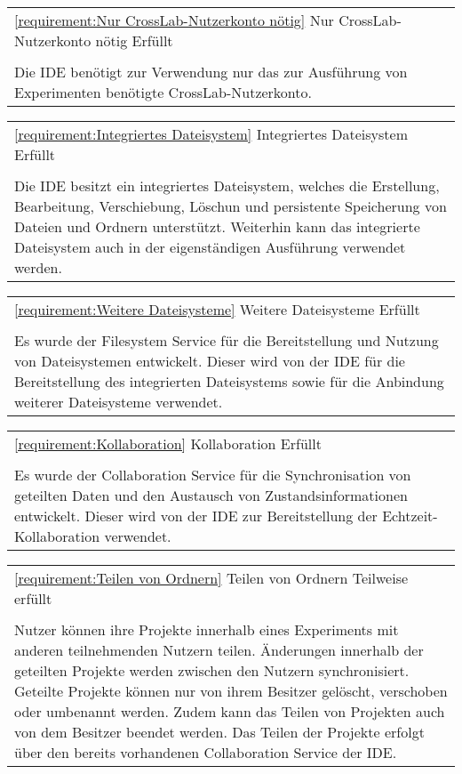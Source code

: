 \vfill
\begin{tabularx}{\textwidth}{X}
    \toprule
    \autoref{requirement:Nur CrossLab-Nutzerkonto nötig} \hfill Nur CrossLab-Nutzerkonto nötig \hfill Erfüllt
    \\
    \\
    Die IDE benötigt zur Verwendung nur das zur Ausführung von Experimenten benötigte CrossLab-Nutzerkonto.
    \\
    \bottomrule
\end{tabularx}
\vfill
\begin{tabularx}{\textwidth}{X}
    \toprule
    \autoref{requirement:Integriertes Dateisystem} \hfill Integriertes Dateisystem \hfill Erfüllt
    \\
    \\
    Die IDE besitzt ein integriertes Dateisystem, welches die Erstellung, Bearbeitung, Verschiebung, Löschun und persistente Speicherung von Dateien und Ordnern unterstützt. Weiterhin kann das integrierte Dateisystem auch in der eigenständigen Ausführung verwendet werden.
    \\
    \bottomrule
\end{tabularx}
\vfill
\begin{tabularx}{\textwidth}{X}
    \toprule
    \autoref{requirement:Weitere Dateisysteme} \hfill Weitere Dateisysteme \hfill Erfüllt
    \\
    \\
    Es wurde der Filesystem Service für die Bereitstellung und Nutzung von Dateisystemen entwickelt. Dieser wird von der IDE für die Bereitstellung des integrierten Dateisystems sowie für die Anbindung weiterer Dateisysteme verwendet.
    \\
    \bottomrule
\end{tabularx}
\vfill
\begin{tabularx}{\textwidth}{X}
    \toprule
    \autoref{requirement:Kollaboration} \hfill Kollaboration \hfill Erfüllt
    \\
    \\
    Es wurde der Collaboration Service für die Synchronisation von geteilten Daten und den Austausch von Zustandsinformationen entwickelt. Dieser wird von der IDE zur Bereitstellung der Echtzeit-Kollaboration verwendet.
    \\
    \bottomrule
\end{tabularx}
\vfill
\begin{tabularx}{\textwidth}{X}
    \toprule
    \autoref{requirement:Teilen von Ordnern} \hfill Teilen von Ordnern \hfill Teilweise erfüllt
    \\
    \\
    Nutzer können ihre Projekte innerhalb eines Experiments mit anderen teilnehmenden Nutzern teilen. Änderungen innerhalb der geteilten Projekte werden zwischen den Nutzern synchronisiert. Geteilte Projekte können nur von ihrem Besitzer gelöscht, verschoben oder umbenannt werden. Zudem kann das Teilen von Projekten auch von dem Besitzer beendet werden. Das Teilen der Projekte erfolgt über den bereits vorhandenen Collaboration Service der IDE.
    \\
    \bottomrule
\end{tabularx}
